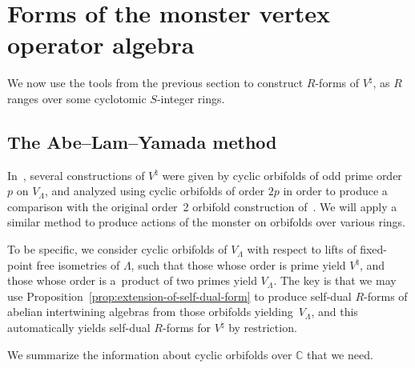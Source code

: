 \documentclass[11pt]{article}
\newcommand{\bC}{\mathbb{C}}
\theoremstyle{definition}
\begin{document}
\section{Forms of the monster vertex operator algebra}

We now use the tools from the previous section to construct $R$-forms of $V^\natural$, as $R$ ranges over some cyclotomic $S$-integer rings.

\subsection{The Abe--Lam--Yamada method}

In~\cite{ALY17}, several constructions of $V^\natural$ were given by cyclic orbifolds of odd prime order $p$ on $V_\Lambda$, and analyzed using cyclic orbifolds of order $2p$ in order to produce a comparison with the original order~2 orbifold construction of~\cite{FLM88}. We will apply a similar method to produce actions of the monster on orbifolds over various rings.

To be specific, we consider cyclic orbifolds of $V_\Lambda$ with respect to lifts of fixed-point free isometries of $\Lambda$, such that those whose order is prime yield $V^\natural$, and those whose order is a~product of two primes yield $V_\Lambda$. The key is that we may use Proposition~\ref{prop:extension-of-self-dual-form} to produce self-dual $R$-forms of abelian intertwining algebras from those orbifolds yielding~$V_\Lambda$, and this automatically yields self-dual $R$-forms for $V^\natural$ by restriction.

We summarize the information about cyclic orbifolds over $\bC$ that we need.
\end{document}
